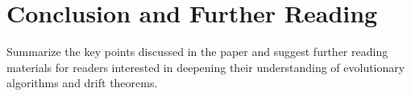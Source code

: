\section{Conclusion and Further Reading}
Summarize the key points discussed in the paper and suggest further reading materials for readers interested in deepening their understanding of evolutionary algorithms and drift theorems.


